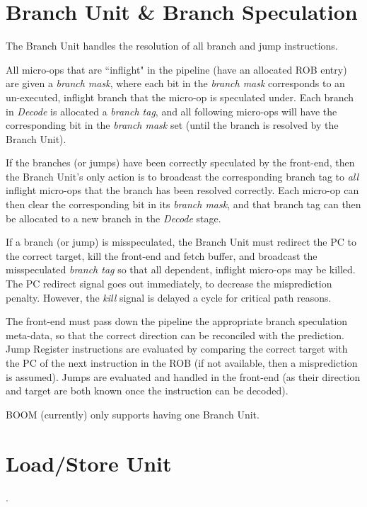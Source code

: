 \section{Branch Unit \& Branch Speculation}

The Branch Unit handles the resolution of all branch and jump instructions.  

All micro-ops that are ``inflight" in the pipeline (have an allocated ROB entry) are given a {\em branch mask}, where each bit in the {\em branch mask} corresponds to an un-executed, inflight branch that the micro-op is speculated under. Each branch in {\em Decode} is allocated a {\em branch tag}, and all following micro-ops will have the corresponding bit in the {\em branch mask} set (until the branch is resolved by the Branch Unit). 

If the branches (or jumps) have been correctly speculated by the front-end, then the Branch Unit's only action is to broadcast the corresponding branch tag to {\em all} inflight micro-ops that the branch has been resolved correctly.  Each micro-op can then clear the corresponding bit in its {\em branch mask}, and that branch tag can then be allocated to a new branch in the {\em Decode} stage. 

If a branch (or jump) is misspeculated, the Branch Unit must redirect the PC to the correct target, kill the front-end and fetch buffer, and broadcast the misspeculated {\em branch tag} so that all dependent, inflight micro-ops may be killed.  The PC redirect signal goes out immediately, to decrease the misprediction penalty.  However, the {\em kill} signal is delayed a cycle for critical path reasons. 

The front-end must pass down the pipeline the appropriate branch speculation meta-data, so that the correct direction can be reconciled with the prediction.  Jump Register instructions are evaluated by comparing the correct target with the PC of the next instruction in the ROB (if not available, then a misprediction is assumed).  Jumps are evaluated and handled in the front-end (as their direction and target are both known once the instruction can be decoded). 


BOOM (currently) only supports having one Branch Unit. %

\section{Load/Store Unit}.


